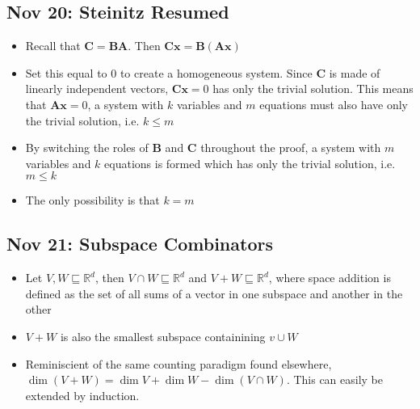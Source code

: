 \documentclass[10pt, oneside]{article}
\let\subspeq\sqsubseteq
\let\leq\leqslant
\newcommand{\R}{\mathbb{R}}
\renewcommand{\vec}[1]{\mathbf{#1}}
\newcommand{\mat}[1]{\mathbf{#1}}
\begin{document}
\subsection{Nov 20: Steinitz Resumed}
\begin{itemize}
    \item Recall that $\mat{C} = \mat{BA}$. Then $\mat{C}\vec{x} = \mat{B}(\mat{A}\vec{x})$
    \item Set this equal to $0$ to create a homogeneous system. Since $\mat{C}$ is made of linearly independent vectors, $\mat{C}\vec{x} = 0$ has only the trivial solution. This means that $\mat{A}\vec{x} = 0$, a system with $k$ variables and $m$ equations must also have only the trivial solution, i.e. $k \leq m$
    \item By switching the roles of $\mat{B}$ and $\mat{C}$ throughout the proof, a system with $m$ variables and $k$ equations is formed which has only the trivial solution, i.e. $m \leq k$
    \item The only possibility is that $k = m$
\end{itemize}

\subsection{Nov 21: Subspace Combinators}
\begin{itemize}
    \item Let $V, W \subspeq \R^d$, then $V \cap W \subspeq \R^d$ and $V + W \subspeq \R^d$, where space addition is defined as the set of all sums of a vector in one subspace and another in the other
    \item $V + W$ is also the smallest subspace containining $v \cup W$
    \item Reminiscient of the same counting paradigm found elsewhere, $\dim (V + W) = \dim V + \dim W - \dim(V \cap W)$. This can easily be extended by induction.
\end{itemize}
\end{document}
